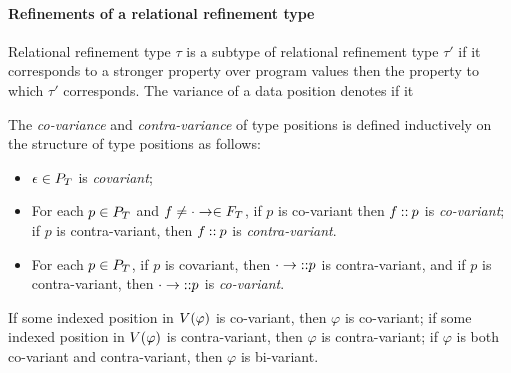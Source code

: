 \paragraph{Refinements of a relational refinement type}
Relational refinement type $\tau$ is a subtype of relational
refinement type $\tau'$ if it corresponds to a stronger property over
program values then the property to which $\tau'$ corresponds.
The variance of a data position denotes if it
%
%
\begin{defn}
  \label{defn:variance}
  The \emph{co-variance} and \emph{contra-variance} of type positions
  is defined inductively on the structure of type positions as
  follows:
  \begin{itemize}
  \item %
    $\epsilon \in P_T$ is \emph{covariant};
  \item %
    For each $p \in P_T$ and
    $f \not= \cdot \to \in F_T$, if $p$ is co-variant then
    $f \mathbin{::} p$ is \emph{co-variant};
    if $p$ is contra-variant, then $f \mathbin{::} p$ is
    \emph{contra-variant}.
  \item %
    For each $p \in P_T$, if $p$ is covariant, then
    $\cdot \to \mathbin{::} p$ is contra-variant, and if $p$ is
    contra-variant, then $\cdot \to \mathbin{::} p$ is \emph{co-variant}.
  \end{itemize}
\end{defn}

If some indexed position in $V(\varphi)$ is co-variant, then
$\varphi$ is co-variant;
%
if some indexed position in $V(\varphi)$ is contra-variant, then
$\varphi$ is contra-variant;
%
if $\varphi$ is both co-variant and contra-variant, then $\varphi$ is
bi-variant.

